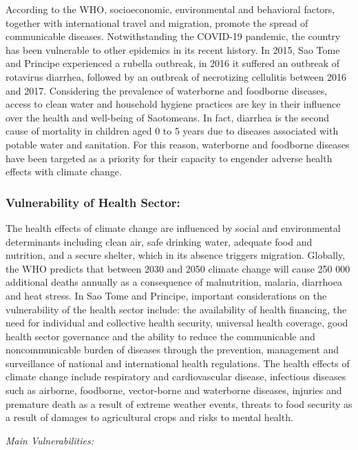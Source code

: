 \documentclass[
]{book}
\begin{document}
According to the WHO, socioeconomic, environmental and behavioral factors, together with international travel and migration, promote the spread of communicable diseases. Notwithstanding the COVID-19 pandemic, the country has been vulnerable to other epidemics in its recent history. In 2015, Sao Tome and Principe experienced a rubella outbreak, in 2016 it suffered an outbreak of rotavirus diarrhea, followed by an outbreak of necrotizing cellulitis between 2016 and 2017. Considering the prevalence of waterborne and foodborne diseases, access to clean water and household hygiene practices are key in their influence over the health and well-being of Saotomeans. In fact, diarrhea is the second cause of mortality in children aged 0 to 5 years due to diseases associated with potable water and sanitation. For this reason, waterborne and foodborne diseases have been targeted as a priority for their capacity to engender adverse health effects with climate change.

\hypertarget{vulnerability-of-health-sector}{%
\subsubsection{Vulnerability of Health Sector:}\label{vulnerability-of-health-sector}}

The health effects of climate change are influenced by social and environmental determinants including clean air, safe drinking water, adequate food and nutrition, and a secure shelter, which in its absence triggers migration. Globally, the WHO predicts that between 2030 and 2050 climate change will cause 250 000 additional deaths annually as a consequence of malnutrition, malaria, diarrhoea and heat stress. In Sao Tome and Principe, important considerations on the vulnerability of the health sector include: the availability of health financing, the need for individual and collective health security, universal health coverage, good health sector governance and the ability to reduce the communicable and noncommunicable burden of diseases through the prevention, management and surveillance of national and international health regulations. The health effects of climate change include respiratory and cardiovascular disease, infectious diseases such as airborne, foodborne, vector-borne and waterborne diseases, injuries and premature death as a result of extreme weather events, threats to food security as a result of damages to agricultural crops and risks to mental health.

\emph{Main Vulnerabilities:}
\end{document}
